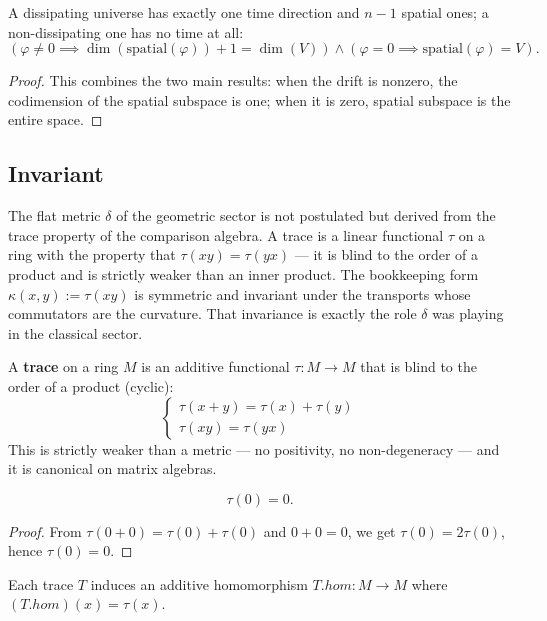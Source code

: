 \begin{theorem}
A dissipating universe has exactly one time direction and $n-1$ spatial ones; a non-dissipating one has no time at all:
\[
(\varphi \neq 0 \implies \dim(\text{spatial}(\varphi)) + 1 = \dim(V)) \land (\varphi = 0 \implies \text{spatial}(\varphi) = V).
\]
\begin{proof}
This combines the two main results: when the drift is nonzero, the codimension of the spatial subspace is one; when it is zero, spatial subspace is the entire space.
\end{proof}
\end{theorem}

\subsection{Invariant}

The flat metric $\delta$ of the geometric sector is not postulated but derived from the trace property of the comparison algebra. A trace is a linear functional $\tau$ on a ring with the property that $\tau(xy) = \tau(yx)$ — it is blind to the order of a product and is strictly weaker than an inner product. The bookkeeping form $\kappa(x,y) := \tau(xy)$ is symmetric and invariant under the transports whose commutators are the curvature. That invariance is exactly the role $\delta$ was playing in the classical sector.

\begin{definition}
A \textbf{trace} on a ring $M$ is an additive functional $\tau: M \to M$ that is blind to the order of a product (cyclic):
\[
\begin{cases}
\tau(x + y) = \tau(x) + \tau(y)\\
\tau(xy) = \tau(yx)
\end{cases}
\]
This is strictly weaker than a metric — no positivity, no non-degeneracy — and it is canonical on matrix algebras.
\end{definition}

\begin{theorem}
\[
\tau(0) = 0.
\]
\begin{proof}
From $\tau(0 + 0) = \tau(0) + \tau(0)$ and $0 + 0 = 0$, we get $\tau(0) = 2\tau(0)$, hence $\tau(0) = 0$.
\end{proof}
\end{theorem}

\begin{definition}
Each trace $T$ induces an additive homomorphism $T.hom: M \to M$ where $(T.hom)(x) = \tau(x)$.
\end{definition}

